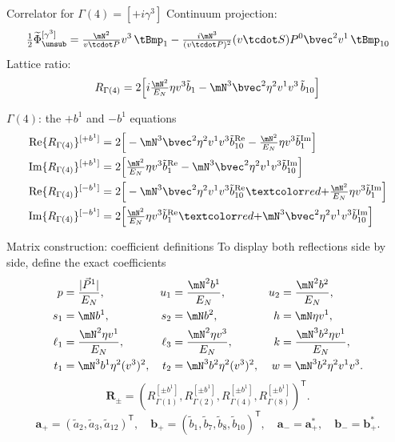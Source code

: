 \begin{frame}{Correlator for $\Gamma(4)=[+i\gamma^3]$}
  \small
  Continuum projection:
  \[ \tfrac12\widetilde\Phi^{[\gamma^3]}_{\unsub}=\tfrac{\mN^2}{v\tcdot P}v^3\,\tBmp_1-\tfrac{i\mN^3}{(v\tcdot P)^2}(v\tcdot S)P^0\bvec^2v^1\,\tBmp_{10} \]
  Lattice ratio:
  \[ R_{\Gamma(4)}=2\Big[i\tfrac{\mN^2}{\En}\eta v^3\tilde b_1-\mN^3\bvec^2\eta^2v^1v^3\,\tilde b_{10}\Big] \]
\end{frame}

\begin{frame}{$\Gamma(4)$: the $+b^1$ and $-b^1$ equations}
  \small
  \begin{align*}
    \Rr{Re}{4}{+b^1}&=2\Big[-\mN^3\bvec^2\eta^2v^1v^3\bR{10}-\tfrac{\mN^2}{\En}\eta v^3\bI1\Big]\\
    \Rr{Im}{4}{+b^1}&=2\Big[\tfrac{\mN^2}{\En}\eta v^3\bR1-\mN^3\bvec^2\eta^2v^1v^3\bI{10}\Big]\\
    \Rr{Re}{4}{-b^1}&=2\Big[-\mN^3\bvec^2\eta^2v^1v^3\bR{10}\fl{+}\tfrac{\mN^2}{\En}\eta v^3\bI1\Big]\\
    \Rr{Im}{4}{-b^1}&=2\Big[\tfrac{\mN^2}{\En}\eta v^3\bR1\fl{+}\mN^3\bvec^2\eta^2v^1v^3\bI{10}\Big]
  \end{align*}
\end{frame}

\begin{frame}{Matrix construction: coefficient definitions}
  \small
  To display both reflections side by side, define the exact coefficients
  \begin{align*}
    p&=\frac{\Pa}{\En},&u_1&=\frac{\mN^2b^1}{\En},&u_2&=\frac{\mN^2b^2}{\En},\\
    s_1&=\mN b^1,&s_2&=\mN b^2,&h&=\mN\eta v^1,\\
    \ell_1&=\frac{\mN^2\eta v^1}{\En},&\ell_3&=\frac{\mN^2\eta v^3}{\En},&k&=\frac{\mN^3b^2\eta v^1}{\En},\\
    t_1&=\mN^3b^1\eta^2(v^3)^2,&t_2&=\mN^3b^2\eta^2(v^3)^2,&w&=\mN^3b^2\eta^2v^1v^3.
  \end{align*}
  \[
  \boldsymbol R_\pm=
   (R_{\Gamma(1)}^{[\pm b^1]},R_{\Gamma(2)}^{[\pm b^1]},
    R_{\Gamma(4)}^{[\pm b^1]},R_{\Gamma(8)}^{[\pm b^1]})^{\mathsf T}.
  \]
  \[
  \boldsymbol a_+=(\tilde a_2,\tilde a_3,\tilde a_{12})^{\mathsf T},\quad
  \boldsymbol b_+=(\tilde b_1,\tilde b_7,\tilde b_8,\tilde b_{10})^{\mathsf T},\quad
  \boldsymbol a_-=\boldsymbol a_+^*,\quad\boldsymbol b_-=\boldsymbol b_+^*.
  \]
\end{frame}

